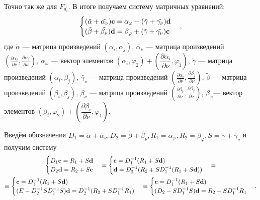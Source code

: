 \documentclass[a4paper]{article}
\begin{document}
Точно так же для $F_{d_i}$. В итоге получаем систему матричных уравнений:
\begin{equation}
  \begin{cases}
    (\tilde{\alpha}+\tilde{\alpha_{\nu}}) {\bf c}= \alpha_{\varphi} + (\tilde{\gamma}+\tilde{\gamma_{\nu}}){\bf d}\\
    (\tilde{\beta}+\tilde{\beta_{\nu}}) {\bf d}= \beta_{\varphi} + (\tilde{\gamma}+\tilde{\gamma_{\nu}}){\bf c}
  \end{cases},
\end{equation}
где $\tilde{\alpha}$ --- матрица произведений $(\alpha_i,\alpha_j)$,
$\tilde{\alpha_{\nu}}$ --- матрица произведений $\left(\frac{\partial \alpha_i}{\partial \nu},\frac{\partial \alpha_j}{\partial \nu} \right)$,
$\alpha_{\varphi}$ --- вектор элементов $(\alpha_i,\varphi_2)+ \left(\dfrac{\partial \alpha_i}{\partial \nu},\varphi_1\right)$,
$\tilde{\gamma}$ --- матрица произведений $(\alpha_i,\beta_j)$,
$\tilde{\gamma_{\nu}}$ --- матрица произведений $\left(\frac{\partial \alpha_i}{\partial \nu},\frac{\partial \beta_j}{\partial \nu} \right)$,
$\tilde{\beta}$ --- матрица произведений $(\beta_i,\beta_j)$,
$\tilde{\beta_{\nu}}$ --- матрица произведений $\left(\frac{\partial \beta_i}{\partial \nu},\frac{\partial \beta_j}{\partial \nu} \right)$,
$\beta_{\varphi}$--- вектор элементов $(\beta_i,\varphi_2)+ \left(\dfrac{\partial \beta_i}{\partial \nu},\varphi_1\right)$.

Введём обозначения $D_1=\tilde{\alpha}+\tilde{\alpha_{\nu}}, D_2=\tilde{\beta}+\tilde{\beta_{\nu}}, R_1=\alpha_{\varphi}, R_2= \beta_{\varphi}, S=\tilde{\gamma}+\tilde{\gamma_{\nu}}$ 
и получим систему
\begin{multline}
  \begin{cases}
    D_1 {\bf c}= R_1 + S{\bf d}\\
    D_2 {\bf d}= R_2 + S{\bf c}
  \end{cases}\equiv
  \begin{cases}
     {\bf c}=D_1^{-1} (R_1 + S{\bf d})\\
    {\bf d}= D_2^{-1}(R_2 + SD_1^{-1} (R_1 + S{\bf d}))
  \end{cases}\equiv\\
  \equiv
  \begin{cases}
     {\bf c}=D_1^{-1} (R_1 + S{\bf d})\\
   (E-D_2^{-1}SD_1^{-1}S) {\bf d}= D_2^{-1}(R_2 + SD_1^{-1} R_1)
  \end{cases}
  \equiv
  \begin{cases}
     {\bf c}=D_1^{-1} (R_1 + S{\bf d})\\
   (D_2-SD_1^{-1}S) {\bf d}=R_2 + SD_1^{-1} R_1
  \end{cases}.
  \label{sist}
\end{multline}
\end{document}
